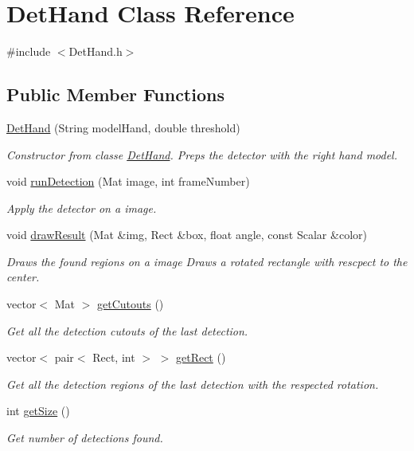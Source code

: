 \hypertarget{class_det_hand}{\section{Det\-Hand Class Reference}
\label{class_det_hand}
}


{\ttfamily \#include $<$Det\-Hand.\-h$>$}

\subsection*{Public Member Functions}
\begin{DoxyCompactItemize}
\item 
\hyperlink{class_det_hand_a55a4b93f15511748a5f645d6e02b7b19}{Det\-Hand} (String model\-Hand, double threshold)
\begin{DoxyCompactList}\small\item\em Constructor from classe \hyperlink{class_det_hand}{Det\-Hand}. Preps the detector with the right hand model. \end{DoxyCompactList}\item 
void \hyperlink{class_det_hand_a1cde0e2c001c37b3f74bcb38af5dddbd}{run\-Detection} (Mat image, int frame\-Number)
\begin{DoxyCompactList}\small\item\em Apply the detector on a image. \end{DoxyCompactList}\item 
void \hyperlink{class_det_hand_ad38224099448661c9442005db103ae8d}{draw\-Result} (Mat \&img, Rect \&box, float angle, const Scalar \&color)
\begin{DoxyCompactList}\small\item\em Draws the found regions on a image Draws a rotated rectangle with rescpect to the center. \end{DoxyCompactList}\item 
vector$<$ Mat $>$ \hyperlink{class_det_hand_a230b128800e15d6b5f87af363b4a72bc}{get\-Cutouts} ()
\begin{DoxyCompactList}\small\item\em Get all the detection cutouts of the last detection. \end{DoxyCompactList}\item 
vector$<$ pair$<$ Rect, int $>$ $>$ \hyperlink{class_det_hand_a424b986edf4a17f48619cb89cd4c2e8e}{get\-Rect} ()
\begin{DoxyCompactList}\small\item\em Get all the detection regions of the last detection with the respected rotation. \end{DoxyCompactList}\item 
int \hyperlink{class_det_hand_af90663feb7d98c57373a2ee7b686fdb2}{get\-Size} ()
\begin{DoxyCompactList}\small\item\em Get number of detections found. \end{DoxyCompactList}\end{DoxyCompactItemize}


